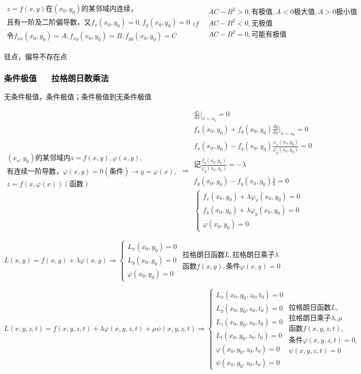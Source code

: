 \documentclass[UTF8]{ctexart}
\newcommand{\mt}[1]{\text{#1}}
\newcommand{\mf}[1]{\left( #1\right)}
\newcommand{\q}{\quad}
\newcommand{\p}{\par}
\newcommand{\ma}[1]{\begin{array}{llll} #1 \end{array}}
\newcommand{\fcz}[1] {
    \left\{
        \begin{array}{llll} #1 \end{array}
    \right.
}
\begin{document}
$\ma{
    z=f\mf{x,y}\mt{在}\mf{x_0,y_0}\mt{的某邻域内连续，}\\ 
    \mt{且有一阶及二阶偏导数，又}f_x\mf{x_0,y_0}=0,f_y\mf{x_0,y_0}=0\\
    \mt{令}f_{xx}\mf{x_0,y_0}=A,f_{xy}\mf{x_0,y_0}=B,f_{yy}\mf{x_0,y_0}=C\\
}if \q \ma{
    AC-B^2>0,\mt{有极值},A<0\mt{极大值},A>0\mt{极小值}\\
    AC-B^2<0,\mt{无极值}\\
    AC-B^2=0,\mt{可能有极值}\\
}$


$\mt{驻点，偏导不存在点}$


\subsubsection{条件极值 $\q$ 拉格朗日数乘法}
无条件极值，条件极值；条件极值到无条件极值\p
$\ma{\mf{x_o,y_0}\mt{的某邻域内}z=f\mf{x,y},\varphi\mf{x,y},\\
\mt{有连续一阶导数}，\varphi\mf{x,y}=0\mf{\mt{条件}}\rightarrow y=\varphi\mf{x},\\
z=f\mf{x,\varphi\mf{x}}\mf{\mt{函数}}}\Rightarrow \ma{
    \frac{dz}{dx}|_{x=x_0}=0\\
    f_x\mf{x_0,y_0}+f_y\mf{x_0,y_0}\frac{dy}{dx}|_{x=x_0}=0\\
    f_x\mf{x_0,y_0}-f_y\mf{x_0,y_0}\frac{\varphi_x\mf{x_0,y_0}}{\varphi_y\mf{x_0,y_0}}=0\\
    \mt{记}\frac{f_y\mf{x_0,y_0}}{\varphi_y\mf{x_0,y_0}}=-\lambda\\
    f_y\mf{x_0,y_0}-f_y\mf{x_0,y_0}\frac{\lambda}{\lambda}=0\\
    \fcz{f_x\mf{x_0,y_0}+\lambda\varphi_x\mf{x_0,y_0}=0\\f_y\mf{x_0,y_0}+\lambda\varphi_y\mf{x_0,y_0}=0\\ \varphi\mf{x_0,y_0}=0}
 
}$

$L\mf{x,y}=f\mf{x,y}+\lambda\varphi\mf{x,y}\Rightarrow \fcz{
    L_x\mf{x_0,y_0}=0\\
    L_y\mf{x_0,y_0}=0\\
    \varphi\mf{x_0,y_0}=0
}\ma{\mt{拉格朗日函数}L,\mt{拉格朗日乘子}\lambda\\
    \mt{函数}f\mf{x,y},\mt{条件}\varphi\mf{x,y}=0
}$


$L\mf{x,y,z,t}=f\mf{x,y,z,t}+\lambda\varphi\mf{x,y,z,t}+\mu\psi\mf{x,y,z,t} \Rightarrow \fcz{
    L_x\mf{x_0,y_0,z_0,t_0}=0\\
    L_y\mf{x_0,y_0,z_0,t_0}=0\\
    L_z\mf{x_0,y_0,z_0,t_0}=0\\
    L_t\mf{x_0,y_0,z_0,t_0}=0\\
    \varphi\mf{x_0,y_0,z_0,t_0}=0\\
    \psi\mf{x_0,y_0,z_0,t_0}=0
}\ma{\mt{拉格朗日函数}L,\\
\mt{拉格朗日乘子}\lambda,\mu \\
    \mt{函数}f\mf{x,y,z,t},\\
    \mt{条件}\varphi\mf{x,y,z,t}=0,\\
    \psi\mf{x,y,z,t}=0
}$
\end{document}
